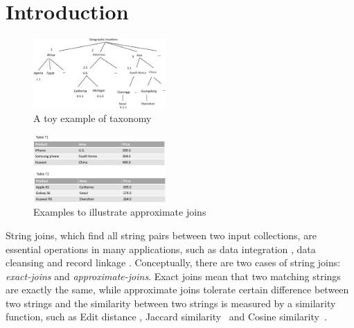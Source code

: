 \section{Introduction}

\begin{figure}[t]
\centering
\includegraphics[width=0.45\textwidth]{figures/taxonomylabels}
 \caption{A toy example of taxonomy}
\label{fig:taxonomyexample}
\end{figure}


\begin{figure}[t]
\centering
\includegraphics[width=0.45\textwidth]{figures/productexample}
 \caption{Examples to illustrate approximate joins}
\label{fig:twotables}
\end{figure}



 String joins, which find all string pairs between two input collections, are essential operations in many applications, such as  data integration \cite{conf/sigmod/Sarawagi04}, data cleansing \cite{conf/vldb/ArasuGK06,journals/www/LiJM06} and record linkage \cite{books/Winkler99}. Conceptually, there are two cases of string joins: \textit{exact-joins} and \textit{approximate-joins}. Exact joins mean that two matching strings are exactly the same, while approximate joins tolerate certain difference between two strings and the similarity between two strings is measured by a similarity function, such as  Edit distance
\cite{journals/pvldb/XiaoWL08,conf/sigmod/WangLF12},  Jaccard
similarity~\cite{conf/icde/ChaudhuriGK06} and Cosine
similarity~\cite{journals/ipm/SaltonB88}.

